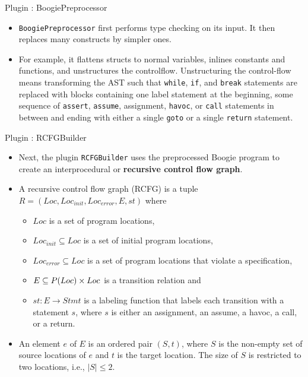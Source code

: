 \documentclass[12pt]{beamer}
\newcommand{\code}[1]{\texttt{#1}}
\begin{document}
\begin{frame}{Plugin : BoogiePreprocessor}
	\begin{itemize}
		\item \code{BoogiePreprocessor} first performs type checking on its input. It then replaces many constructs by simpler ones.
		\item For example, it flattens structs to normal variables, inlines constants and functions, and unstructures the controlflow. Unstructuring the control-flow means transforming the AST such that \code{while}, \code{if}, and \code{break} statements are replaced with blocks containing one label statement at the beginning, some sequence of \code{assert}, \code{assume}, assignment, \code{havoc}, or \code{call} statements in between and ending with either a single \code{goto} or a single \code{return} statement.
	\end{itemize}
\end{frame}

\begin{frame}{Plugin : RCFGBuilder}
	\begin{itemize}
		\item Next, the plugin \code{RCFGBuilder} uses the preprocessed Boogie program to create an interprocedural or \textbf{recursive control flow graph}.
		\item A recursive control flow graph (RCFG) is a tuple $R = (Loc, Loc_{init}, Loc_{error}, E, st)$ where
		\begin{itemize}
			\item $Loc$ is a set of program locations,
			\item $Loc_{init} \subseteq Loc$ is a set of initial program locations,
			\item $Loc_{error} \subseteq Loc$ is a set of program locations that violate a specification,
			\item $E \subseteq \mathnormal{P}(Loc) \times Loc$ is a transition relation and
			\item $st : E \to Stmt$  is a labeling function that labels each transition with a statement $s$, where $s$ is either an assignment, an assume, a havoc, a call, or a return.
		\end{itemize}
		\item An element $e$ of $E$ is an ordered pair $(S, t)$, where $S$ is the non-empty set of source locations of $e$ and $t$ is the target location. The size of $S$ is restricted to two locations, i.e., $|S| \leq 2$.
	\end{itemize}
\end{frame}
\end{document}
